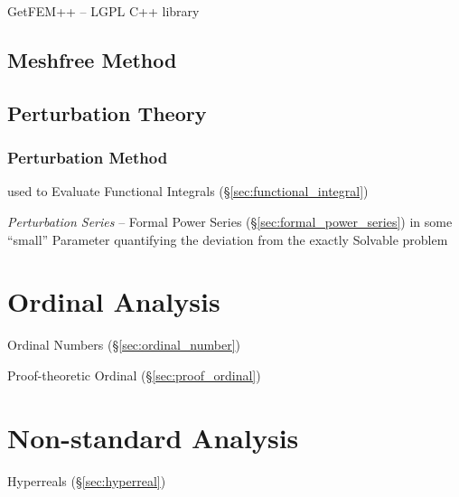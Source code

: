 GetFEM++ -- LGPL C++ library



\subsection{Meshfree Method}\label{sec:meshfree_method}

\subsection{Perturbation Theory}\label{sec:perturbation_theory}

\subsubsection{Perturbation Method}\label{sec:perturbation_method}

used to Evaluate Functional Integrals (\S\ref{sec:functional_integral})

\emph{Perturbation Series} -- Formal Power Series
(\S\ref{sec:formal_power_series}) in some ``small'' Parameter quantifying the
deviation from the exactly Solvable problem



\section{Ordinal Analysis}\label{sec:ordinal_analysis}

Ordinal Numbers (\S\ref{sec:ordinal_number})

Proof-theoretic Ordinal (\S\ref{sec:proof_ordinal})



\section{Non-standard Analysis}\label{sec:nonstandard_analysis}

Hyperreals (\S\ref{sec:hyperreal})

